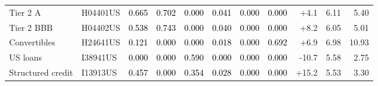 \documentclass[a4paper,review]{cas-sc}
\begin{document}
\begin{table}[pos=htbp]
\begin{adjustbox}{max width=\linewidth}
\begin{tabular}{llrrrrrrrrr}
Tier 2 A & H04401US & \cellcolor[HTML]{EE9677}\textcolor{black}{0.665} & \cellcolor[HTML]{EA8E70}\textcolor{black}{0.702} & \cellcolor[HTML]{FFFFFF}\textcolor{black}{0.000} & \cellcolor[HTML]{F8F3F0}\textcolor{black}{0.041} & \cellcolor[HTML]{FFFFFF}\textcolor{black}{0.000} & \cellcolor[HTML]{FFFFFF}\textcolor{black}{0.000} & +4.1 & 6.11 & 5.40 \\
Tier 2 BBB & H04402US & \cellcolor[HTML]{F6B191}\textcolor{black}{0.538} & \cellcolor[HTML]{E58368}\textcolor{black}{0.743} & \cellcolor[HTML]{FFFFFF}\textcolor{black}{0.000} & \cellcolor[HTML]{F8F3F0}\textcolor{black}{0.040} & \cellcolor[HTML]{FFFFFF}\textcolor{black}{0.000} & \cellcolor[HTML]{FFFFFF}\textcolor{black}{0.000} & +8.2 & 6.05 & 5.01 \\
Convertibles & H24641US & \cellcolor[HTML]{F9EBE3}\textcolor{black}{0.121} & \cellcolor[HTML]{FFFFFF}\textcolor{black}{0.000} & \cellcolor[HTML]{FFFFFF}\textcolor{black}{0.000} & \cellcolor[HTML]{F7F5F4}\textcolor{black}{0.018} & \cellcolor[HTML]{FFFFFF}\textcolor{black}{0.000} & \cellcolor[HTML]{EA8E70}\textcolor{black}{0.692} & +6.9 & 6.98 & 10.93 \\
US loans & I38941US & \cellcolor[HTML]{FFFFFF}\textcolor{black}{0.000} & \cellcolor[HTML]{FFFFFF}\textcolor{black}{0.000} & \cellcolor[HTML]{F4A683}\textcolor{black}{0.590} & \cellcolor[HTML]{FFFFFF}\textcolor{black}{0.000} & \cellcolor[HTML]{FFFFFF}\textcolor{black}{0.000} & \cellcolor[HTML]{FFFFFF}\textcolor{black}{0.000} & -10.7 & 5.58 & 2.75 \\
Structured credit & I13913US & \cellcolor[HTML]{F8BFA4}\textcolor{black}{0.457} & \cellcolor[HTML]{FFFFFF}\textcolor{black}{0.000} & \cellcolor[HTML]{FBD0B9}\textcolor{black}{0.354} & \cellcolor[HTML]{F8F4F2}\textcolor{black}{0.028} & \cellcolor[HTML]{FFFFFF}\textcolor{black}{0.000} & \cellcolor[HTML]{FFFFFF}\textcolor{black}{0.000} & +15.2 & 5.53 & 3.30 \\
\bottomrule
\end{tabular}
\end{adjustbox}
\end{table}
\end{document}
